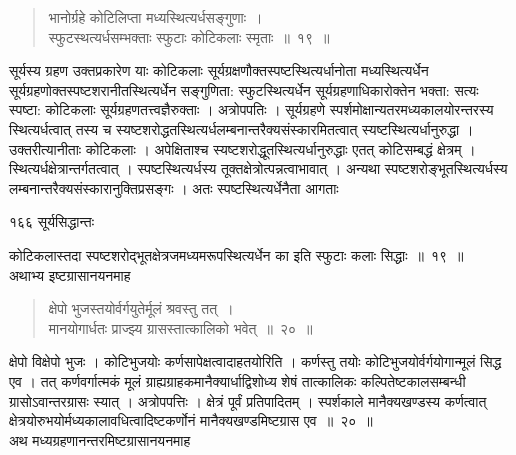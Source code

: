 \documentclass[11pt, openany]{book}
\begin{document}
\begin{quote}
 {\ssi भानोर्ग्रहे कोटिलिप्ता मध्यस्थित्यर्धसङ्गुणाः~।\\
स्फुटस्थत्यर्धसम्भक्ताः स्फुटाः कोटिकलाः स्मृताः~॥~१९~॥}
\end{quote}

\begin{sloppypar}
 सूर्यस्य ग्रहण उक्तप्रकारेण याः कोटिकलाः सूर्यग्रक्षणौक्तस्पष्टस्थित्यर्धानोता मध्यस्थित्यर्धेन सूर्यग्रहणोक्तस्पष्टशरानीतस्थित्यर्धेन सङ्गुणिता: स्फुटस्थित्यर्धेन सूर्यग्रहणाधिकारोक्तेन भक्ता: सत्यः स्पष्टा: कोटिकलाः सूर्यग्रहणतत्त्वज्ञैरुक्ताः । अत्रोपपतिः । सूर्यग्रहणे स्पर्शमोक्षान्यतरमध्यकालयोरन्तरस्य स्थित्यर्धत्वात् तस्य च स्यष्टशरोद्धतस्थित्यर्धलम्बनान्तरैक्यसंस्कारमितत्वात् स्यष्टस्थित्यर्धानुरुद्धा । उक्तरीत्यानीताः कोटिकलाः । अपेक्षिताश्च स्यष्टशरोद्धूतस्थित्यर्धानुरुद्धाः एतत् कोटिसम्बद्धं क्षेत्रम् । स्थित्यर्धक्षेत्रान्तर्गतत्वात् । स्पष्टस्थित्यर्धस्य तूक्तक्षेत्रोत्पन्नत्वाभावात् । अन्यथा स्पष्टशरोङ्भूतस्थित्यर्धस्य लम्बनान्तरैक्यसंस्कारानुक्तिप्रसङ्गः । अतः स्पष्टस्थित्यर्धेनैता आगताः
\end{sloppypar}

\newpage



\noindent  १६६ \hspace{4cm} सूर्यसिद्धान्तः 
\vspace{1cm}


\noindent कोटिकलास्तदा स्पष्टशरोद्भूतक्षेत्रजमध्यमरूपस्थित्यर्धेन का इति स्फुटाः कलाः सिद्धाः~॥~१९~॥\\
\noindent अथाभ्य इष्टग्रासानयनमाह\textendash


\begin{quote}
  {\ssi क्षेपो भुजस्तयोर्वर्गयुतेर्मूलं श्रवस्तु तत्~।\\
मानयोगार्धतः प्राज्झ्य ग्रासस्तात्कालिको भवेत्~॥~२०~॥}
\end{quote}

\begin{sloppypar}
 क्षेपो विक्षेपो भुजः । कोटिभुजयोः कर्णसापेक्षत्वादाह\textendash तयोरिति । कर्णस्तु तयोः कोटिभुजयोर्वर्गयोगान्मूलं सिद्ध एव । तत् कर्णवर्गात्मकं मूलं ग्राह्यग्राहकमानैक्यार्धाद्विशोध्य शेषं तात्कालिकः कल्पितेष्टकालसम्बन्धी ग्रासोऽवान्तरग्रासः स्यात् । अत्रोपपत्तिः । क्षेत्रं पूर्वं प्रतिपादितम् । स्पर्शकाले मानैक्यखण्डस्य कर्णत्वात् क्षेत्रयोरुभयोर्मध्यकालावधित्वादिष्टकर्णोनं मानैक्यखण्डमिष्टग्रास एव~॥~२०~॥\\
 \noindent अथ मध्यग्रहणानन्तरमिष्टग्रासानयनमाह\textendash
\end{sloppypar}
\end{document}
